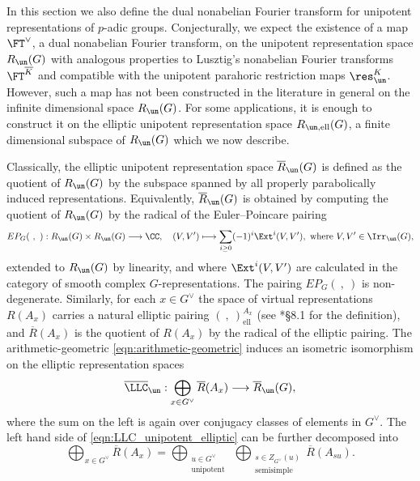 In this section we also define the dual nonabelian Fourier transform for unipotent representations of $p$-adic groups. Conjecturally, we expect the existence of a map $\FT^\vee$, a dual nonabelian Fourier transform, on the unipotent representation space $R_{\un}(G)$ with analogous properties to Lusztig's nonabelian Fourier transforms $\FT^{\overline{K}}$ and compatible with the unipotent parahoric restriction maps $\res_{\un}^K$. However, such a map has not been constructed in the literature in general on the infinite dimensional space $R_{\un}(G)$. For some applications, it is enough to construct it on the elliptic unipotent representation space $R_{\un,\mathrm{ell}}(G)$, a finite dimensional subspace of $R_{\un}(G)$ which we now describe. 

Classically, the elliptic unipotent representation space $\overline{R}_{\un}(G)$ is defined as the quotient of $R_{\un}(G)$ by the subspace spanned by all properly parabolically induced representations. Equivalently, $\overline{R}_{\un}(G)$ is obtained by computing the quotient of $R_{\un}(G)$ by the radical of the Euler--Poincare pairing
\begin{equation*}
    EP_G(\ ,\ ):R_{\un}(G)\times R_{\un}(G)\longrightarrow\CC,\quad (V,V')\longmapsto\sum_{i\geq0}(-1)^i\Ext^i(V,V'),\text{ where }V,V'\in\Irr_{\un}(G),
\end{equation*}
extended to $R_{\un}(G)$ by linearity, and where $\Ext^i(V,V')$ are calculated in the category of smooth complex $G$-representations. The pairing $EP_G(\ ,\ )$ is non-degenerate. Similarly, for each $x\in G^\vee$ the space of virtual representations $R(A_x)$ carries a natural elliptic pairing $(\ ,\ )^{A_x}_{\mathrm{ell}}$ (see \cite{AubertCiubotaruRomano2024}*{\S8.1} for the definition), and $\overline{R}(A_x)$ is the quotient of $R(A_x)$ by the radical of the elliptic pairing. The arithmetic-geometric \eqref{eqn:arithmetic-geometric} induces an isometric isomorphism on the elliptic representation spaces
\begin{equation}\label{eqn:LLC_unipotent_elliptic}
    \overline{\LLC}_{\un}:\bigoplus_{x\in G^\vee}\overline{R}(A_x)\longrightarrow\overline{R}_{\un}(G),
\end{equation}
where the sum on the left is again over conjugacy classes of elements in $G^\vee$. The left hand side of \eqref{eqn:LLC_unipotent_elliptic} can be further decomposed into
$$\bigoplus_{x\in G^\vee}\overline{R}(A_x)=\bigoplus_{\substack{u\in G^\vee\\\mathrm{unipotent}}}\ \bigoplus_{\substack{s\in Z_{G^\vee}(u)\\\mathrm{semisimple}}}\overline{R}(A_{su}).$$
